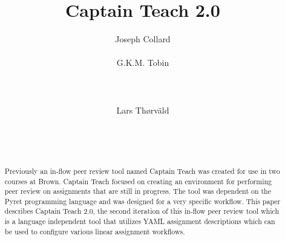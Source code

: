 \documentclass{sig-alternate}
\begin{document}
%

\title{Captain Teach 2.0}

%
\author{
%
%
\alignauthor
Joseph Collard\\
       \\
\alignauthor
G.K.M. Tobin\\
       \\
       \\
       \\
\alignauthor Lars Th{\o}rv{\"a}ld\\
       \\
       \\
       \\
}

\maketitle
\begin{abstract}
Previously an in-flow peer review tool named Captain Teach was created for use 
in two courses at Brown. Captain Teach focused on creating an environment for
performing peer review on assignments that are still in progress.  
The tool was dependent on the Pyret programming language and was designed for 
a very specific workflow. This paper describes Captain Teach 2.0, the second 
iteration of this in-flow peer review tool which is a language independent tool 
that utilizes YAML assignment descriptions which can be used to configure various
linear assignment workflows. 
\end{abstract}
\end{document}
